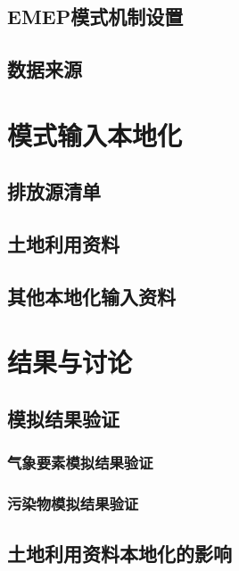 \documentclass[a4paper]{article}
\begin{document}
\subsection{EMEP模式机制设置}

\subsection{数据来源}

\section{模式输入本地化}
\subsection{排放源清单}
\subsection{土地利用资料}
\subsection{其他本地化输入资料}
\section{结果与讨论}
\subsection{模拟结果验证}
\subsubsection{气象要素模拟结果验证}
\subsubsection{污染物模拟结果验证}
\subsection{土地利用资料本地化的影响}
\end{document}
